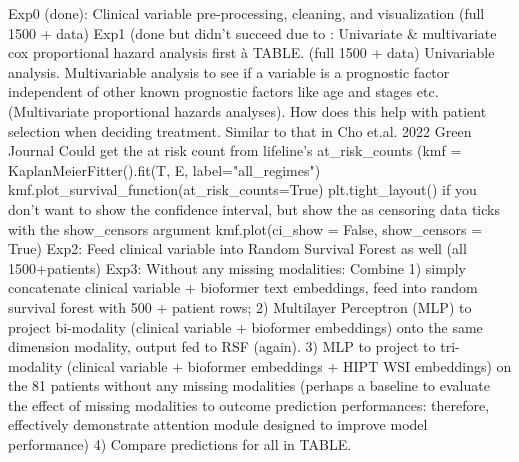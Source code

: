 \documentclass{article}%
\begin{document}
%
Exp0 (done): Clinical variable pre{-}processing, cleaning, and visualization (full 1500 + data)%
\newline%
\newline%
%
Exp1 (done but didn’t succeed due to : Univariate \& multivariate cox proportional hazard analysis first à TABLE. (full 1500 + data) %
\newline%
\newline%
%
Univariable analysis. %
\newline%
\newline%
%
Multivariable analysis to see if a variable is a prognostic factor independent of other known prognostic factors like age and stages etc. (Multivariate proportional hazards analyses). How does this help with patient selection when deciding treatment. %
\newline%
\newline%
%
Similar to that in Cho et.al. 2022 Green Journal %
\newline%
\newline%
%
%
\newline%
\newline%
%
Could get the at risk count from lifeline’s at\_risk\_counts %
\newline%
\newline%
%
(kmf = KaplanMeierFitter().fit(T, E, label="all\_regimes")%
\newline%
\newline%
%
kmf.plot\_survival\_function(at\_risk\_counts=True)%
\newline%
\newline%
%
plt.tight\_layout()%
\newline%
\newline%
%
if you don’t want to show the confidence interval, but show the as censoring data ticks with the show\_censors argument %
\newline%
\newline%
%
kmf.plot(ci\_show = False, show\_censors = True) %
\newline%
\newline%
%
%
\newline%
\newline%
%
Exp2: Feed clinical variable into Random Survival Forest as well (all 1500+patients)%
\newline%
\newline%
%
Exp3: Without any missing modalities: Combine 1) simply concatenate clinical variable + bioformer text embeddings, feed into random survival forest with 500 + patient rows; 2) Multilayer Perceptron (MLP) to project bi{-}modality (clinical variable + bioformer embeddings) onto the same dimension modality, output fed to RSF (again). 3) MLP to project to tri{-}modality (clinical variable + bioformer embeddings + HIPT WSI embeddings) on the 81 patients without any missing modalities (perhaps a baseline to evaluate the effect of missing modalities to outcome prediction performances: therefore, effectively demonstrate attention module designed to improve model performance) 4) Compare predictions for all in TABLE. %
\end{document}
